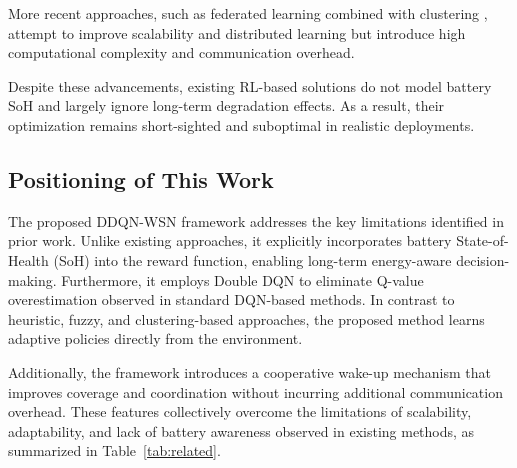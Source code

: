 \documentclass[journal]{IEEEtran}
\begin{document}
More recent approaches, such as federated learning combined with
clustering \cite{mohammed2024}, attempt to improve scalability and
distributed learning but introduce high computational complexity and
communication overhead.

Despite these advancements, existing RL-based solutions do not model
battery SoH and largely ignore long-term degradation effects. As a
result, their optimization remains short-sighted and suboptimal in
realistic deployments.

\subsection{Positioning of This Work}

The proposed DDQN-WSN framework addresses the key limitations identified
in prior work. Unlike existing approaches, it explicitly incorporates
battery State-of-Health (SoH) into the reward function, enabling
long-term energy-aware decision-making. Furthermore, it employs Double
DQN to eliminate Q-value overestimation observed in standard DQN-based
methods. In contrast to heuristic, fuzzy, and clustering-based
approaches, the proposed method learns adaptive policies directly from
the environment.

Additionally, the framework introduces a cooperative wake-up mechanism
that improves coverage and coordination without incurring additional
communication overhead. These features collectively overcome the
limitations of scalability, adaptability, and lack of battery awareness
observed in existing methods, as summarized in
Table~\ref{tab:related}.
\end{document}
